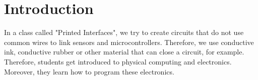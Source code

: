 
    \section{Introduction}
    \begin{flushleft}
        In a class called "Printed Interfaces", we try to create circuits that do not use common wires 
        to link sensors and microcontrollers. Therefore, we use conductive ink, conductive rubber or other
        material that can close a circuit, for example. Therefore, students get introduced to physical 
        computing and electronics. Moreover, they learn how to program these electronics. 
    \end{flushleft}
